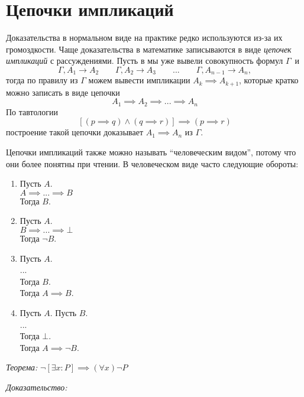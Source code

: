 \section{Цепочки импликаций}

Доказательства в нормальном виде на практике редко используются из-за их
громоздкости.
Чаще доказательства в математике записываются в виде {\it цепочек импликаций}
с рассуждениями.
Пусть в мы уже вывели совокупность формул $\Gamma$~и
\[
	\Gamma,A_1\to A_2\qquad \Gamma,A_2\to A_3
	\qquad  ... \qquad \Gamma,A_{n-1}\to A_{n},
\]
тогда по правилу \implic{} из $\Gamma$ можем вывести импликации
${A_{k}\implies A_{k+1}}$, которые кратко можно записать в виде цепочки
\[
	A_1\implies A_2\implies ...\implies A_{n}
\]
По тавтологии
\[
	[(p\implies q)\land (q\implies r)]\implies (p\implies r)
\]
построение такой цепочки доказывает $A_1\implies A_{n}$ из $\Gamma$.

Цепочки импликаций также можно называть ``человеческим видом'', потому что они более
понятны при чтении.
В человеческом виде часто следующие обороты:
\begin{fullwidth}
	\begin{multicols}{4}
		\begin{enumerate}[label=(\roman*)]
			\item{}
			Пусть $A$.\\
			$A\implies...\implies B$\\
			Тогда $B$.
			\item{}
			Пусть $A$.\\
			$B\implies ...\implies \bot$\\
			Тогда $\lnot B$.
			\item{}
			Пусть $A$.\\
			...\\
			Тогда $B$.\\
			Тогда $A\implies B$.
			\item{}
			Пусть $A$. Пусть $B$.\\
			...\\
			Тогда $\bot$.\\
			Тогда $A\implies \lnot B$.\\
		\end{enumerate}
	\end{multicols}
\end{fullwidth}

\vspace{1em}
{\it Теорема:} $\lnot[\exists x:P]\implies (\forall x)\lnot P$

{\it Доказательство:}

